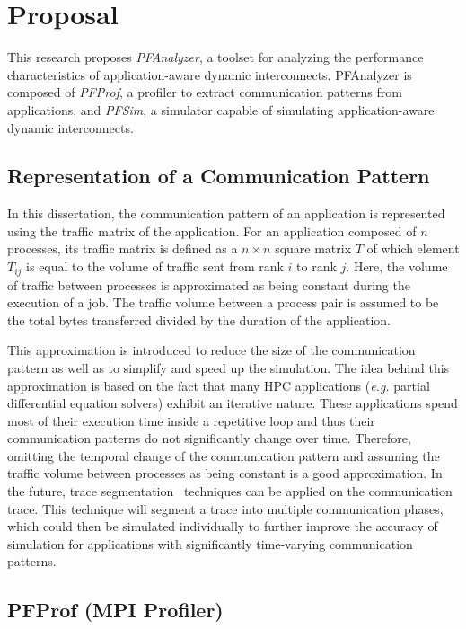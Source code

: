 \section{Proposal}\label{sec:ii-proposal}

This research proposes \emph{PFAnalyzer}, a toolset for analyzing the
performance characteristics of application-aware dynamic interconnects.
PFAnalyzer is composed of \emph{PFProf}, a profiler to extract communication
patterns from applications, and \emph{PFSim}, a simulator capable of
simulating application-aware dynamic interconnects.

\subsection{Representation of a Communication Pattern}

In this dissertation, the communication pattern of an application is
represented using the traffic matrix of the application. For an application
composed of \(n\) processes, its traffic matrix is defined as a \(n \times n\)
square matrix \(T\) of which element \(T_{ij}\) is equal to the volume of
traffic sent from rank \(i\) to rank \(j\). Here, the volume of
traffic between processes is approximated as being constant during the
execution of a job. The traffic volume between a process pair is assumed to be
the total bytes transferred divided by the duration of the application.

This approximation is introduced to reduce the size of the communication
pattern as well as to simplify and speed up the simulation. The idea behind
this approximation is based on the fact that many HPC applications
(\emph{e.g.} partial differential equation solvers) exhibit an iterative
nature. These applications spend most of their execution time inside a
repetitive loop and thus their communication patterns do not significantly
change over time. Therefore, omitting the temporal change of the communication
pattern and assuming the traffic volume between processes as being constant is
a good approximation. In the future, trace segmentation~\autocite{Alawneh2016}
techniques can be applied on the communication trace. This technique will
segment a trace into multiple communication phases, which could then be
simulated individually to further improve the accuracy of simulation for
applications with significantly time-varying communication patterns.

\subsection{PFProf (MPI Profiler)}\label{sec:ii-pfprof}

